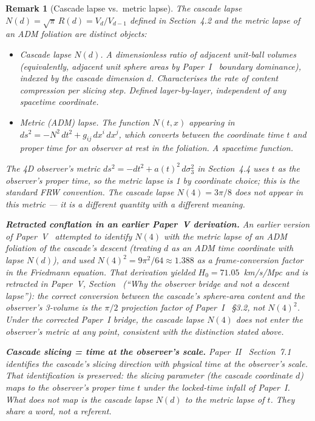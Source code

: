 \documentclass[12pt,a4paper]{article}
\newtheorem*{remark}{Remark}
\begin{document}
\begin{remark}[Cascade lapse vs.\ metric lapse]\label{rem:cascade-vs-metric-lapse}
The cascade lapse $N(d) = \sqrt{\pi}\,R(d) = V_d/V_{d-1}$ defined in
Section~4.2 and the metric lapse of an ADM foliation are distinct
objects:
\begin{itemize}
\item \emph{Cascade lapse $N(d)$.} A dimensionless ratio of adjacent
unit-ball volumes (equivalently, adjacent unit sphere areas by
Paper~I~\cite{part0} boundary dominance), indexed by the cascade
dimension $d$. Characterises the rate of content compression per
slicing step. Defined layer-by-layer, independent of any spacetime
coordinate.
\item \emph{Metric (ADM) lapse.} The function $N(t,x)$ appearing in
$ds^2 = -N^2\,dt^2 + g_{ij}\,dx^i\,dx^j$, which converts between the
coordinate time $t$ and proper time for an observer at rest in the
foliation. A spacetime function.
\end{itemize}
The 4D observer's metric $ds^2 = -dt^2 + a(t)^2\,d\sigma_3^2$ in
Section~4.4 uses $t$ as the observer's proper time, so the metric
lapse is 1 by coordinate choice; this is the standard FRW convention.
The cascade lapse $N(4) = 3\pi/8$ does not appear in this metric --- it
is a different quantity with a different meaning.

\medskip\noindent\textbf{Retracted conflation in an earlier Paper~V derivation.}
An earlier version of Paper~V~\cite{part5} attempted to identify
$N(4)$ with the metric lapse of an ADM foliation of the cascade's
descent (treating $d$ as an ADM time coordinate with lapse $N(d)$), and
used $N(4)^2 = 9\pi^2/64 \approx 1.388$ as a frame-conversion factor
in the Friedmann equation. That derivation yielded $H_0 = 71.05$~km/s/Mpc
and is retracted in Paper~V, Section~ (``Why the observer bridge and
not a descent lapse''): the correct conversion between the cascade's
sphere-area content and the observer's 3-volume is the $\pi/2$
projection factor of Paper~I~\cite{part0} §3.2, not $N(4)^2$. Under
the corrected Paper~I bridge, the cascade lapse $N(4)$ does not enter
the observer's metric at any point, consistent with the distinction
stated above.

\medskip\noindent\textbf{Cascade slicing = time at the observer's scale.}
Paper~II~\cite{part2} Section~7.1 identifies the cascade's slicing
direction with physical time at the observer's scale. That
identification is preserved: the slicing parameter (the cascade
coordinate $d$) maps to the observer's proper time $t$ under the
locked-time infall of Paper~I. What does not map is the cascade
lapse $N(d)$ to the metric lapse of $t$. They share a word, not a
referent.
\end{remark}
\end{document}
